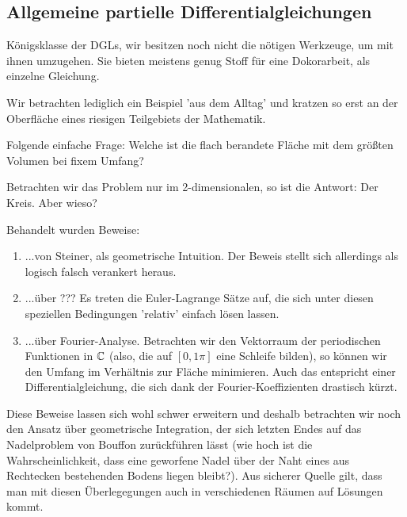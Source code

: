 \documentclass[main.tex]{subfiles}
\begin{document}
\subsection{Allgemeine partielle Differentialgleichungen}

Königsklasse der DGLs, wir besitzen noch nicht die nötigen Werkzeuge, um mit ihnen umzugehen. Sie bieten meistens genug Stoff für eine Dokorarbeit, als einzelne Gleichung.

Wir betrachten lediglich ein Beispiel 'aus dem Alltag' und kratzen so erst an der Oberfläche eines riesigen Teilgebiets der Mathematik.

\begin{Beispiel}
  Folgende einfache Frage: Welche ist die flach berandete Fläche mit dem größten Volumen bei fixem Umfang?

  Betrachten wir das Problem nur im 2-dimensionalen, so ist die Antwort: Der Kreis. Aber wieso?

  Behandelt wurden Beweise:
  \begin{enumerate}
    \item ...von Steiner, als geometrische Intuition. Der Beweis stellt sich allerdings als logisch falsch verankert heraus.
    \item ...über ??? Es treten die Euler-Lagrange Sätze auf, die sich unter diesen speziellen Bedingungen 'relativ' einfach lösen lassen.
    \item ...über Fourier-Analyse. Betrachten wir den Vektorraum der periodischen Funktionen in $\mathbb{C}$ (also, die auf $[0,1\pi]$ eine Schleife bilden), so können wir den Umfang im Verhältnis zur Fläche minimieren. Auch das entspricht einer Differentialgleichung, die sich dank der Fourier-Koeffizienten drastisch kürzt.
  \end{enumerate}

  Diese Beweise lassen sich wohl schwer erweitern und deshalb betrachten wir noch den Ansatz über geometrische Integration, der sich letzten Endes auf das Nadelproblem von Bouffon zurückführen lässt (wie hoch ist die Wahrscheinlichkeit, dass eine geworfene Nadel über der Naht eines aus Rechtecken bestehenden Bodens liegen bleibt?). Aus sicherer Quelle gilt, dass man mit diesen Überlegegungen auch in verschiedenen Räumen auf Lösungen kommt.
\end{Beispiel}
\end{document}
